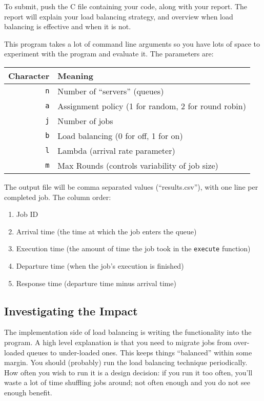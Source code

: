 \documentclass[letterpaper,10pt]{article}
\begin{document}
To submit, push the C file containing your code, along with your report. The report will explain your load balancing strategy, and overview when load balancing is effective and when it is not.

This program takes a lot of command line arguments so you have lots of space to experiment with the program and evaluate it. The parameters are:

\begin{center}
	\begin{tabular}{r|l}
	\textbf{Character} & \textbf{Meaning} \\ \hline
	\texttt{n} & Number of ``servers'' (queues) \\
	\texttt{a} & Assignment policy (1 for random, 2 for round robin) \\
	\texttt{j} & Number of jobs \\
	\texttt{b} & Load balancing (0 for off, 1 for on) \\
	\texttt{l} & Lambda (arrival rate parameter) \\
	\texttt{m} & Max Rounds (controls variability of job size) \\
	\end{tabular}
\end{center}

The output file will be comma separated values (``results.csv''), with one line per completed job. The column order:
\begin{enumerate}
	\item Job ID
	\item Arrival time (the time at which the job enters the queue)
	\item Execution time (the amount of time the job took in the \texttt{execute} function)
	\item Departure time (when the job's execution is finished)
	\item Response time (departure time minus arrival time)
\end{enumerate}


\subsection{Investigating the Impact}

The implementation side of load balancing is writing the functionality into the program. A high level explanation is that you need to migrate jobs from over-loaded queues to under-loaded ones. This keeps things ``balanced'' within some margin. You should (probably) run the load balancing technique periodically. How often you wish to run it is a design decision: if you run it too often, you'll waste a lot of time shuffling jobs around; not often enough and you do not see enough benefit.
\end{document}
